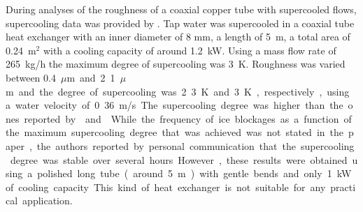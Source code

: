 During analyses of the  roughness of a coaxial copper tube with supercooled flows, supercooling data was provided by \cite{ernst_influence_2016}. 
Tap water was supercooled in a coaxial tube heat exchanger with an inner diameter of 8 mm, a length of 5~m, a total area of 0.24~m$^2$ with a  cooling capacity of around 1.2~kW.
Using a mass flow rate of 265~kg/h the maximum degree of supercooling was 3~K.
Roughness was varied between 0.4~\si{$\mu$m} and 2.1~\si{$\mu$m} and the degree of supercooling was 2.3~K and 3~K, respectively, using a water velocity of 0.36~m/s.
The supercooling degree was higher than the ones reported by \cite{bedecarrats_ice_2010} and \cite{castaing-lasvignottes_dynamic_2006}.
While the frequency of ice blockages as a function of the maximum supercooling degree that was achieved was not stated in the paper, the authors reported by personal communication that the supercooling degree was stable over several hours. 
However, these results were obtained using a polished long tube (around 5~m) with gentle bends and only 1~kW of cooling capacity. This kind of heat exchanger is not suitable for any practical application.


